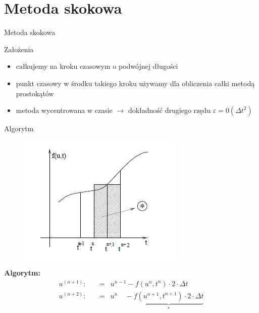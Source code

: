 \section{Metoda skokowa}
\begin{frame}{Metoda skokowa}
	\begin{block}{Założenia}
	\begin{itemize}
	\item całkujemy na  kroku czasowym o podwójnej długości
    \item punkt czasowy w środku takiego kroku używamy dla obliczenia całki metodą prostokątów
    \item metoda wycentrowana w czasie $\rightarrow $ dokładność drugiego rzędu $\varepsilon = 0({\Delta t}^2)$
	\end{itemize}
	\end{block}
\end{frame}
\begin{frame}{Algorytm}
	\begin{figure}
	\includegraphics[height=0.5\textheight]{img/22/metoda_skokowa1.jpg}
	\end{figure}
    \textbf{Algorytm:}
    $$ \begin{array}{rcl}
      u^{(n+1)}:\quad &=&u^{n-1} -f(u^n,t^n)\cdot 2 \cdot \Delta t\\
      u^{(n+2)}:\quad &=&u^n \quad -\underbrace{f(u^{n+1},t^{n+1})\cdot 2 \cdot \Delta t}_{\text{*}}
      \end{array} $$
    
\end{frame}

